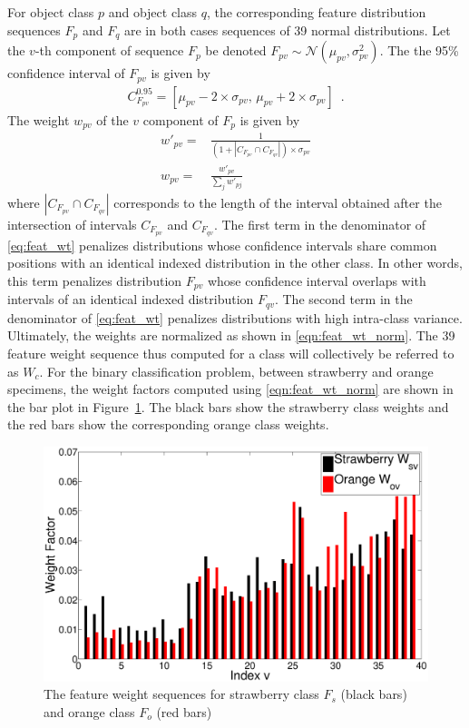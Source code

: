 \documentclass {udthesis}
\begin{document}
For object class $p$ and object class $q$, the corresponding feature distribution sequences $F_p$ and $F_q$ are in both cases sequences of 39 normal distributions. Let the $v$-th component of sequence $F_p$ be denoted $F_{pv}\sim\mathcal{N}(\mu_{pv},\sigma^2_{pv})$.
The the 95\% confidence interval of $F_{pv}$ is given by
%
\begin{align}	\label{eqn:conf_interval}
C^{0.95}_{F_{pv}}=[\mu_{pv}-2 \times \sigma_{pv},\, \mu_{pv}+2 \times \sigma_{pv}]\enspace .
\end{align}
%
The weight $w_{pv}$ of the $v$ component of $F_p$ is given by
\begin{align}
 w'_{pv}= & \frac{1}{(1+ |C_{F_{pv}} \cap C_{F_{qv}}| )\times \sigma_{pv}} \label{eq:feat_wt}\\
 w_{pv}= & \frac{w'_{pv}}{\sum_{j} w'_{pj}} \label{eqn:feat_wt_norm}
\end{align}
where $|C_{F_{pv}} \cap C_{F_{qv}}|$ corresponds to the length of the interval obtained after the intersection of intervals $C_{F_{pv}}$ and $C_{F_{qv}}$. The first term in the denominator of \eqref{eq:feat_wt} penalizes distributions whose confidence intervals share common positions with an identical indexed distribution in the other class. In other words, this term penalizes distribution $F_{pv}$ whose confidence interval overlaps with intervals of an identical indexed distribution $F_{qv}$. The second term in the denominator of \eqref{eq:feat_wt} penalizes distributions with high intra-class variance. Ultimately, the weights are normalized as shown in \eqref{eqn:feat_wt_norm}. The 39 feature weight sequence thus computed for a class will collectively be referred to as $W_c$. For the binary classification problem, between strawberry and orange specimens, the weight factors computed using \eqref{eqn:feat_wt_norm} are shown in the bar plot in Figure~\ref{fig:feat_weights}. The black bars show the strawberry class 
weights and the red 
bars show the corresponding orange class weights.
%
\begin{figure}
  \centering
  \includegraphics[width=\textwidth]{feature_weights}
  \caption[Feature weights]{The feature weight sequences for strawberry class $F_s$ (black bars) and orange class $F_o$ (red bars)}
  \label{fig:feat_weights}
\end{figure}	
%
\end{document}
